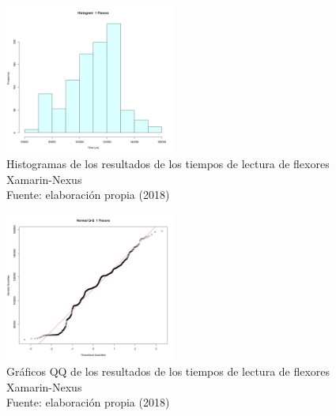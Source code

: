 \begin{figure}
 \begin{center} 
   	\includegraphics[width=0.5\textwidth]{evaluation/graphics/Xamarin/Nexus/HistFlexorsXamarinNexus.png} 
   	\captionsetup{justification=centering}
    \caption[Histogramas de los resultados de los tiempos de lectura de flexores Xamarin-Nexus]{Histogramas de los resultados de los tiempos de lectura de flexores  Xamarin-Nexus\\Fuente: elaboración propia (2018)} 
    \label{fig:xamarin-nexus-hist-flexors}
  \end{center}
\end{figure}

\begin{figure}[H]
  \begin{center} 
   	\includegraphics[width=0.5\textwidth]{evaluation/graphics/Xamarin/Nexus/NormalQQFlexorsXamarinNexus.png} 
   	\captionsetup{justification=centering}
    \caption[Gráfico QQ de los resultados de los tiempos de lectura de flexores Xamarin-Nexus]{Gráficos QQ de los resultados de los tiempos de lectura de flexores Xamarin-Nexus\\Fuente: elaboración propia (2018)} 
    \label{fig:xamarin-nexus-QQ-flexors}
  \end{center}
\end{figure}


